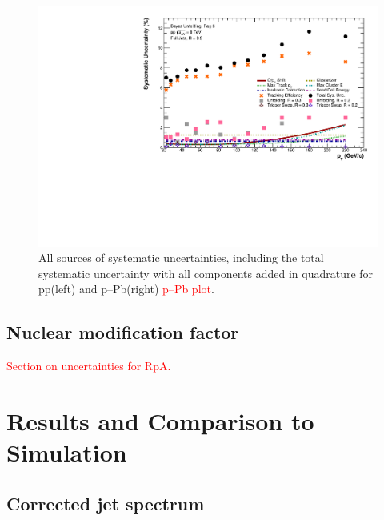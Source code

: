 \documentclass[ALICE]{ALICE_analysis_notes}
\newcommand{\pPb}{{\mbox{p--Pb}}\xspace}
\newcommand{\pp}{pp\xspace}
\begin{document}
\begin{figure}
    \centering
    \includegraphics[width=15cm]{figures/Systematics/ratios/TotalSystematics_R02R03.pdf}
    \caption{All sources of systematic uncertainties, including the total systematic uncertainty with all components added in quadrature for \pp (left) and \pPb (right) \textcolor{red}{\pPb plot}.}
    \label{fig:SystematicsRatiosR02}
\end{figure}

\subsection{Nuclear modification factor}
\label{sec:systematicsRpA}

\textcolor{red}{Section on uncertainties for RpA.}\clearpage{}
\clearpage{}\section{Results and Comparison to Simulation}
\label{chap:results}

\subsection{Corrected jet spectrum}
\label{sec:corrJetSpectrum}
\end{document}
